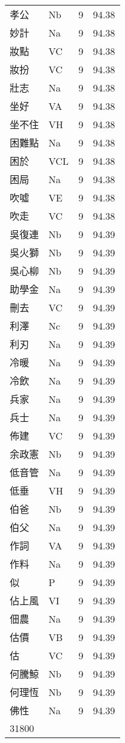 \documentclass[twocolumn]{book}
\begin{document}
\begin{supertabular}{llrr}
孝公 & Nb & 9 &  94.38\\
妙計 & Na & 9 &  94.38\\
妝點 & VC & 9 &  94.38\\
妝扮 & VC & 9 &  94.38\\
壯志 & Na & 9 &  94.38\\
坐好 & VA & 9 &  94.38\\
坐不住 & VH & 9 &  94.38\\
困難點 & Na & 9 &  94.38\\
困於 & VCL & 9 &  94.38\\
困局 & Na & 9 &  94.38\\
吹噓 & VE & 9 &  94.38\\
吹走 & VC & 9 &  94.38\\
吳復連 & Nb & 9 &  94.39\\
吳火獅 & Nb & 9 &  94.39\\
吳心柳 & Nb & 9 &  94.39\\
助學金 & Na & 9 &  94.39\\
刪去 & VC & 9 &  94.39\\
利澤 & Nc & 9 &  94.39\\
利刃 & Na & 9 &  94.39\\
冷暖 & Na & 9 &  94.39\\
冷飲 & Na & 9 &  94.39\\
兵家 & Na & 9 &  94.39\\
兵士 & Na & 9 &  94.39\\
佈建 & VC & 9 &  94.39\\
余政憲 & Nb & 9 &  94.39\\
低音管 & Na & 9 &  94.39\\
低垂 & VH & 9 &  94.39\\
伯爸 & Nb & 9 &  94.39\\
伯父 & Na & 9 &  94.39\\
作詞 & VA & 9 &  94.39\\
作料 & Na & 9 &  94.39\\
似 & P & 9 &  94.39\\
佔上風 & VI & 9 &  94.39\\
佃農 & Na & 9 &  94.39\\
估價 & VB & 9 &  94.39\\
估 & VC & 9 &  94.39\\
何騰鯨 & Nb & 9 &  94.39\\
何理恆 & Nb & 9 &  94.39\\
佛性 & Na & 9 &  94.39\\
31800\\

\end{supertabular}
\end{document}
